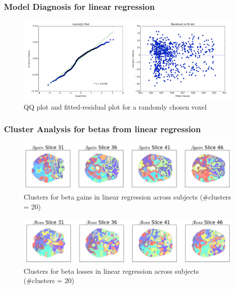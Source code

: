 \documentclass[11pt]{article}
\begin{document}
\subsubsection{Model Diagnosis for linear regression}

\begin{figure}[H]
    \centering
        \includegraphics[scale=0.4]{figures/Regression2/diagnosis.png}
    \caption{QQ plot and fitted-residual plot for a randomly chosen voxel}
\end{figure}

\subsubsection{Cluster Analysis for betas from linear regression}

\begin{figure}[H]
    \centering
        \includegraphics[scale=0.4]{figures/Regression2/beta_gain_cluster.png}
    \caption{Clusters for beta gains in linear regression across subjects (\#clusters = 20)}
\end{figure}

\begin{figure}[H]
    \centering
        \includegraphics[scale=0.4]{figures/Regression2/beta_loss_cluster.png}
    \caption{Clusters for beta losses in linear regression across subjects (\#clusters = 20)}
\end{figure}
\end{document}
